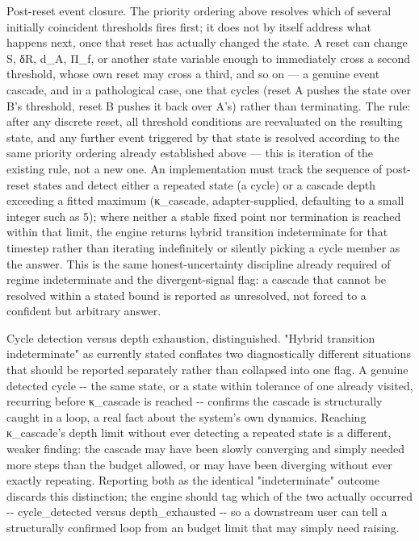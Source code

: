 \documentclass[
]{article}
\begin{document}
Post-reset event closure. The priority ordering above resolves which of
several initially coincident thresholds fires first; it does not by
itself address what happens next, once that reset has actually changed
the state. A reset can change S, δR, d\_A, Π\_f, or another state
variable enough to immediately cross a second threshold, whose own reset
may cross a third, and so on --- a genuine event cascade, and in a
pathological case, one that cycles (reset A pushes the state over B's
threshold, reset B pushes it back over A's) rather than terminating. The
rule: after any discrete reset, all threshold conditions are reevaluated
on the resulting state, and any further event triggered by that state is
resolved according to the same priority ordering already established
above --- this is iteration of the existing rule, not a new one. An
implementation must track the sequence of post-reset states and detect
either a repeated state (a cycle) or a cascade depth exceeding a fitted
maximum (κ\_cascade, adapter-supplied, defaulting to a small integer
such as 5); where neither a stable fixed point nor termination is
reached within that limit, the engine returns hybrid transition
indeterminate for that timestep rather than iterating indefinitely or
silently picking a cycle member as the answer. This is the same
honest-uncertainty discipline already required of regime indeterminate
and the divergent-signal flag: a cascade that cannot be resolved within
a stated bound is reported as unresolved, not forced to a confident but
arbitrary answer.

Cycle detection versus depth exhaustion, distinguished. "Hybrid
transition indeterminate" as currently stated conflates two
diagnostically different situations that should be reported separately
rather than collapsed into one flag. A genuine detected cycle -\/- the
same state, or a state within tolerance of one already visited,
recurring before κ\_cascade is reached -\/- confirms the cascade is
structurally caught in a loop, a real fact about the system's own
dynamics. Reaching κ\_cascade's depth limit without ever detecting a
repeated state is a different, weaker finding: the cascade may have been
slowly converging and simply needed more steps than the budget allowed,
or may have been diverging without ever exactly repeating. Reporting
both as the identical "indeterminate" outcome discards this distinction;
the engine should tag which of the two actually occurred -\/-
cycle\_detected versus depth\_exhausted -\/- so a downstream user can
tell a structurally confirmed loop from an budget limit that may simply
need raising.
\end{document}
